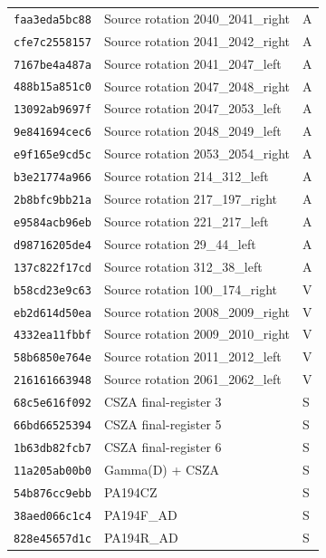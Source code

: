 \begin{longtable}{@{}p{2.3cm}p{7.8cm}p{2.25cm}@{}}
\texttt{faa3eda5bc88} & Source rotation 2040\_2041\_right & A\\
\texttt{cfe7c2558157} & Source rotation 2041\_2042\_right & A\\
\texttt{7167be4a487a} & Source rotation 2041\_2047\_left & A\\
\texttt{488b15a851c0} & Source rotation 2047\_2048\_right & A\\
\texttt{13092ab9697f} & Source rotation 2047\_2053\_left & A\\
\texttt{9e841694cec6} & Source rotation 2048\_2049\_left & A\\
\texttt{e9f165e9cd5c} & Source rotation 2053\_2054\_right & A\\
\texttt{b3e21774a966} & Source rotation 214\_312\_left & A\\
\texttt{2b8bfc9bb21a} & Source rotation 217\_197\_right & A\\
\texttt{e9584acb96eb} & Source rotation 221\_217\_left & A\\
\texttt{d98716205de4} & Source rotation 29\_44\_left & A\\
\texttt{137c822f17cd} & Source rotation 312\_38\_left & A\\
\texttt{b58cd23e9c63} & Source rotation 100\_174\_right & V\\
\texttt{eb2d614d50ea} & Source rotation 2008\_2009\_right & V\\
\texttt{4332ea11fbbf} & Source rotation 2009\_2010\_right & V\\
\texttt{58b6850e764e} & Source rotation 2011\_2012\_left & V\\
\texttt{216161663948} & Source rotation 2061\_2062\_left & V\\
\texttt{68c5e616f092} & CSZA final-register 3 & S\\
\texttt{66bd66525394} & CSZA final-register 5 & S\\
\texttt{1b63db82fcb7} & CSZA final-register 6 & S\\
\texttt{11a205ab00b0} & Gamma(D) + CSZA & S\\
\texttt{54b876cc9ebb} & PA194CZ & S\\
\texttt{38aed066c1c4} & PA194F\_AD & S\\
\texttt{828e45657d1c} & PA194R\_AD & S\\
\end{longtable}\normalsize
